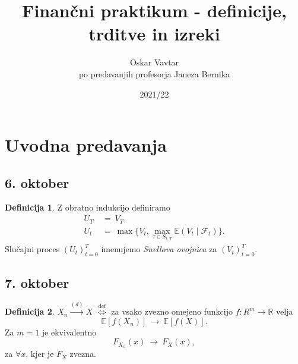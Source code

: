 \documentclass[11pt]{article}
\title{Finančni praktikum - definicije, trditve in izreki}
\author{Oskar Vavtar \\
po predavanjih profesorja Janeza Bernika}
\date{2021/22}
\newcommand{\R}{\mathbb{R}}
\newcommand{\E}{\mathbb{E}}
\newcommand{\F}{\mathcal{F}}
\newcommand{\diff}{\overset{\text{def}}{\iff}}
\newcommand{\set}[1]{\{#1\}}
\theoremstyle{definition}
\newtheorem{definicija}{Definicija}[section]
\theoremstyle{definition}
\theoremstyle{definition}
\theoremstyle{definition}
\begin{document}
\maketitle
\pagebreak
\tableofcontents
\pagebreak


\section{Uvodna predavanja}
\vspace{0.5cm}


\subsection*{6. oktober}
\vspace{0.5cm}

\begin{definicija}

Z obratno indukcijo definiramo 
\begin{align*}
U_T ~&=~ V_T,\\
U_t ~&=~ \max \set{V_t,\max_{\tau \in S_{t,T}} \E(V_t \mid \F_t)}.
\end{align*}
Slučajni proces $(U_t)_{t=0}^T$ imenujemo \textit{Snellova ovojnica} za $(V_t)_{t=0}^T$.

\end{definicija}
\vspace{0.5cm}


\subsection*{7. oktober}
\vspace{0.5cm}

\begin{definicija}

$X_n \xrightarrow{(d)} X$ $\diff$ za vsako zvezno omejeno funkcijo \hbox{$f: R^m \rightarrow \R$} velja
$$\E[f(X_n)] ~\longrightarrow~ \E[f(X)].$$
Za $m=1$ je ekvivalentno 
$$F_{X_n}(x) ~\longrightarrow~ F_X(x),$$
za $\forall x$, kjer je $F_X$ zvezna.

\end{definicija}
\vspace{0.5cm}
\end{document}
